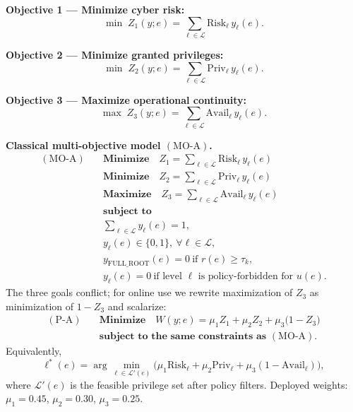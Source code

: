 \textbf{Objective 1 --- Minimize cyber risk:}
\begin{equation}
\min\; Z_1(y;e)=\sum_{\ell\in\mathcal{L}} \mathrm{Risk}_{\ell}\, y_{\ell}(e).
\tag{A1}
\end{equation}

\textbf{Objective 2 --- Minimize granted privileges:}
\begin{equation}
\min\; Z_2(y;e)=\sum_{\ell\in\mathcal{L}} \mathrm{Priv}_{\ell}\, y_{\ell}(e).
\tag{A2}
\end{equation}

\textbf{Objective 3 --- Maximize operational continuity:}
\begin{equation}
\max\; Z_3(y;e)=\sum_{\ell\in\mathcal{L}} \mathrm{Avail}_{\ell}\, y_{\ell}(e).
\tag{A3}
\end{equation}

\textbf{Classical multi-objective model $(\mathrm{MO}\text{-}\mathrm{A})$.}
\begin{equation}
\begin{aligned}
(\mathrm{MO}\text{-}\mathrm{A})\quad
& \textbf{Minimize}\quad Z_1=\sum_{\ell\in\mathcal{L}} \mathrm{Risk}_{\ell}\, y_{\ell}(e) \\
& \textbf{Minimize}\quad Z_2=\sum_{\ell\in\mathcal{L}} \mathrm{Priv}_{\ell}\, y_{\ell}(e) \\
& \textbf{Maximize}\quad Z_3=\sum_{\ell\in\mathcal{L}} \mathrm{Avail}_{\ell}\, y_{\ell}(e) \\[0.35em]
& \textbf{subject to} \\
& \sum_{\ell\in\mathcal{L}} y_{\ell}(e)=1, \\
& y_{\ell}(e)\in\{0,1\},\ \forall \ell\in\mathcal{L}, \\
& y_{\mathrm{FULL\_ROOT}}(e)=0\ \text{if } r(e)\geq \tau_k, \\
& y_{\ell}(e)=0\ \text{if level $\ell$ is policy-forbidden for $u(e)$}.
\end{aligned}
\tag{A}\label{art-eq:moo-priv}
\end{equation}
The three goals conflict; for online use we rewrite maximization of $Z_3$ as minimization of $1-Z_3$ and scalarize:
\begin{equation}
\begin{aligned}
(\mathrm{P}\text{-}\mathrm{A})\quad
& \textbf{Minimize}\quad W(y;e)=\mu_1 Z_1+\mu_2 Z_2+\mu_3\bigl(1-Z_3\bigr) \\[0.35em]
& \textbf{subject to the same constraints as }(\mathrm{MO}\text{-}\mathrm{A}).
\end{aligned}
\tag{PA}\label{art-eq:moo-priv-scalar}
\end{equation}
Equivalently,
\begin{equation}
\ell^*(e)=\arg\min_{\ell\in\mathcal{L}'(e)}\bigl(\mu_1\mathrm{Risk}_{\ell}+\mu_2\mathrm{Priv}_{\ell}+\mu_3(1-\mathrm{Avail}_{\ell})\bigr),
\tag{A4}
\end{equation}
where $\mathcal{L}'(e)$ is the feasible privilege set after policy filters. Deployed weights: $\mu_1{=}0.45$, $\mu_2{=}0.30$, $\mu_3{=}0.25$.

